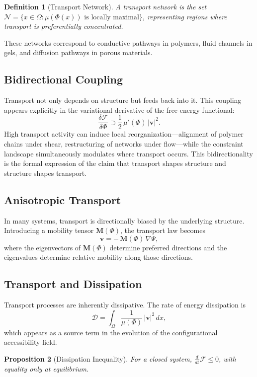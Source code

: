 \documentclass[11pt, a4paper, twocolumn]{article}
\newtheorem{definition}{Definition}[section]
\newtheorem{proposition}[definition]{Proposition}
\newcommand{\F}{\mathcal{F}}
\begin{document}
\begin{definition}[Transport Network]
A transport network is the set
$\mathcal{N} = \{ x \in \Omega : \mu(\Phi(x)) \text{ is locally maximal} \}$,
representing regions where transport is preferentially concentrated.
\end{definition}

These networks correspond to conductive pathways in polymers, fluid channels
in gels, and diffusion pathways in porous materials.

\subsection{Bidirectional Coupling}

Transport not only depends on structure but feeds back into it. This coupling
appears explicitly in the variational derivative of the free-energy functional:
\[
    \frac{\delta \F}{\delta \Phi}
    \supset
    \frac{1}{2}\,\mu'(\Phi)\,|\mathbf{v}|^2.
\]
High transport activity can induce local reorganization---alignment of polymer
chains under shear, restructuring of networks under flow---while the constraint
landscape simultaneously modulates where transport occurs. This bidirectionality
is the formal expression of the claim that transport shapes structure and
structure shapes transport.

\subsection{Anisotropic Transport}

In many systems, transport is directionally biased by the underlying structure.
Introducing a mobility tensor $\mathbf{M}(\Phi)$, the transport law becomes
\[
    \mathbf{v} = -\,\mathbf{M}(\Phi)\,\nabla \Psi,
\]
where the eigenvectors of $\mathbf{M}(\Phi)$ determine preferred directions and
the eigenvalues determine relative mobility along those directions.

\subsection{Transport and Dissipation}

Transport processes are inherently dissipative. The rate of energy dissipation is
\[
    \mathcal{D} = \int_{\Omega} \frac{1}{\mu(\Phi)}\,|\mathbf{v}|^2 \, dx,
\]
which appears as a source term in the evolution of the configurational
accessibility field.

\begin{proposition}[Dissipation Inequality]
For a closed system, $\frac{d}{dt}\F \leq 0$, with equality only at
equilibrium.
\end{proposition}
\end{document}

